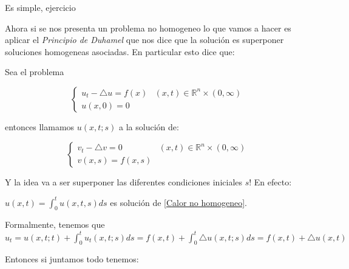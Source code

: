\documentclass[11pt]{article}
\newcommand{\R}{{\mathbb{R}}}
\newenvironment{proof}[1][Demostraci\'on]{\begin{trivlist}
\item[\hskip \labelsep {\bfseries #1}]}{\end{trivlist}}
\newenvironment{remark}[1][Observaci\'on]{\begin{trivlist}
\item[\hskip \labelsep {\bfseries #1}]}{\end{trivlist}}
\begin{document}
\begin{proof}
Es simple, ejercicio
\end{proof}

Ahora si se nos presenta un problema no homogeneo lo que vamos a hacer es aplicar el \textit{Principio de Duhamel} que nos dice que la soluci\'on es superponer soluciones homogeneas asociadas. En particular esto dice que:

Sea el problema

\begin{equation}
\label{Calor no homogeneo}
{
	\left\{
		\begin{array}{ll}
			u_t -  \triangle u = f(x) & (x,t) \in \R^n \times (0,\infty) \\
			u(x,0)=0 & 
		\end{array}
	\right.
}
\end{equation}

entonces llamamos $u(x,t;s)$ a la soluci\'on de:

\begin{equation}
\label{Calor  homogeneo asociado}
{
	\left\{
		\begin{array}{ll}
			v_t -  \triangle v = 0 & (x,t) \in \R^n \times (0,\infty) \\
			v(x,s)= f(x,s) & 
		\end{array}
	\right.
}
\end{equation}

Y la idea va a ser superponer las diferentes condiciones iniciales $s$! En efecto:

\begin{remark}
$u(x,t) = \int_{0}^{t}{u(x,t,s)ds}$ es soluci\'on de \ref{Calor no homogeneo}.
\end{remark}

\begin{proof}
Formalmente, tenemos que $u_t = u(x,t;t) + \int_{0}^{t}{u_t(x,t;s)ds} = f(x,t) + \int_{0}^{t}{\triangle u (x,t;s)ds} = f(x,t) + \triangle u(x,t)$
\end{proof}

Entonces si juntamos todo tenemos:
\end{document}
